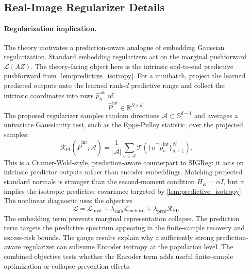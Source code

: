 \subsection{Real-Image Regularizer Details}
\label{app:real-image-regularizer-details}

\paragraph{Regularization implication.}
The theory motivates a prediction-aware analogue of embedding Gaussian
regularization. Standard embedding regularizers act on the marginal pushforward
$\mathcal L(AZ)$. The theory-facing object here is the intrinsic end-to-end
predictive pushforward from
\cref{lem:predictive_isotropy}. For a minibatch, project the learned predicted
outputs onto the learned rank-$d$ predictive range and collect the intrinsic
coordinates into rows $\widehat p_n^{\mathrm{int}}$ of
\[
    \widehat P^{\mathrm{int}} \in \mathbb{R}^{N\times d}.
\]
The proposed regularizer samples random directions
$\mathcal A\subset\mathbb S^{d-1}$ and averages a univariate Gaussianity test,
such as the Epps-Pulley statistic, over the projected samples:
\[
    \mathcal R_{\mathrm{PI}}(\widehat P^{\mathrm{int}};\mathcal A)
    =
    \frac{1}{|\mathcal A|}
    \sum_{u\in\mathcal A}
    \mathcal T\!\left(\{u^\top \widehat p_n^{\mathrm{int}}\}_{n=1}^N\right).
\]
This is a Cramer-Wold-style, prediction-aware counterpart to SIGReg: it acts
on intrinsic predictor outputs rather than encoder embeddings. Matching
projected standard normals is stronger than the second-moment condition
$H_K=\alpha I$, but it implies the isotropic predictive covariance targeted by
\cref{lem:predictive_isotropy}. The nonlinear diagnostic uses the objective
\[
    \mathcal L
    =
    \mathcal L_{\mathrm{pred}}
    +
    \lambda_{\mathrm{emb}}\mathcal L_{\mathrm{emb\text{-}iso}}
    +
    \lambda_{\mathrm{pred}}\mathcal R_{\mathrm{PI}}.
\]
The embedding term prevents marginal representation collapse. The prediction
term targets the predictive spectrum appearing in the finite-sample recovery
and excess-risk bounds. The gauge results explain why a sufficiently strong
prediction-aware regularizer can subsume Encoder isotropy at the population
level. The combined objective tests whether the Encoder term adds useful
finite-sample optimization or collapse-prevention effects.

